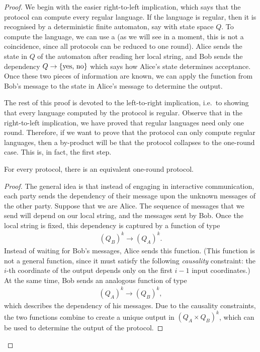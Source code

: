 \begin{proof}
\AP
  We begin with the easier right-to-left implication, which says that the protocol can compute every regular language. If the language is  regular, then it  is recognised by a deterministic finite automaton, say  with state space $Q$. To compute the language, we can use a
   (as we will see in a moment, this is not a coincidence, since all protocols can be reduced to one round). Alice sends the state in $Q$ of the automaton after reading her local string, and Bob sends the dependency $Q \to \{\text{yes, no}\}$ which says how Alice's state determines acceptance. Once these two pieces of information are known, we can apply the function from Bob's message to the state in Alice's message to determine the output.

  The rest of this proof is devoted to the left-to-right implication, i.e.~to showing that every language computed by the protocol is regular. 
  Observe that in the right-to-left implication, we have proved that regular languages need only one round. Therefore, if we want to  prove that the protocol can only compute regular languages, then a by-product will be that the protocol collapses to the one-round case.  This is, in fact, the first step. 
  \begin{lemma}\label{lem:one-round-reduction-boolean}
    For every protocol, there is an equivalent one-round protocol. 
  \end{lemma}
  \begin{proof}
    The general idea is that instead of engaging in interactive communication, each party sends the dependency of their message upon the unknown messages of the other party. Suppose that we are  Alice. The sequence of messages that we send will depend on our local string, and  the messages sent by Bob. Once the local string is fixed, this dependency is captured by a function of type 
    \begin{align*}
    (Q_B)^k \to (Q_A)^k.
    \end{align*}
    Instead of waiting for Bob's messages, Alice sends this function. (This function is not a general function, since it must satisfy the following \emph{causality} constraint: the $i$-th coordinate of the output depends only on the first $i-1$ input coordinates.) At the same time, Bob sends an analogous function of type 
    \begin{align*}
    (Q_A)^k \to (Q_B)^k,
    \end{align*}
    which describes the dependency of his messages. Due to the causality constraints, the two functions combine to create a unique output in $(Q_A \times Q_B)^k$, which can be used to determine the output of the protocol.
  \end{proof}


\end{proof}
